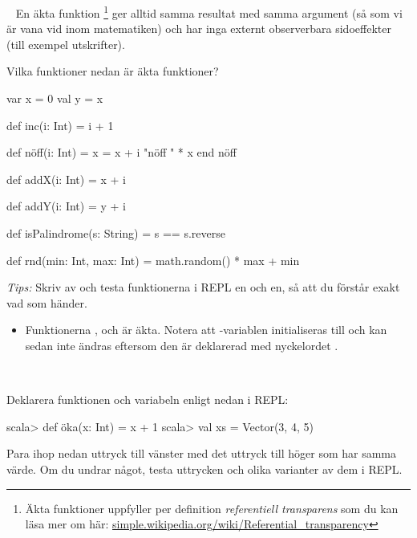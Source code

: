 \QUESTBEGIN

\Task  \what~  En äkta funktion%
\footnote{Äkta funktioner uppfyller per definition  \textit{referentiell transparens}  som du kan läsa mer om här:  \href{https://simple.wikipedia.org/wiki/Referential_transparency}{simple.wikipedia.org/wiki/Referential\_transparency}}
 ger alltid samma resultat med samma argument (så som vi är vana vid inom matematiken) och har inga externt observerbara sidoeffekter (till exempel utskrifter).

Vilka funktioner nedan är äkta funktioner?
\begin{Code}
var x = 0
val y = x

def inc(i: Int) = i + 1

def nöff(i: Int) = 
  x = x + i
  "nöff " * x
end nöff

def addX(i: Int) = x + i

def addY(i: Int) = y + i

def isPalindrome(s: String) = s == s.reverse

def rnd(min: Int, max: Int) = math.random() * max + min
\end{Code}


\noindent\emph{Tips:} Skriv av och testa funktionerna i REPL en och en, så att du förstår exakt vad som händer.

\SOLUTION

\TaskSolved \what

\begin{itemize}
  \item Funktionerna  ,  och  är äkta. Notera att -variablen initialiseras till  och kan sedan inte ändras eftersom den är deklarerad med nyckelordet .
\end{itemize}

\QUESTEND



\QUESTBEGIN

\Task  \what~

\noindent Deklarera funktionen  och variabeln  enligt nedan i REPL:
\begin{REPL}
scala> def öka(x: Int) = x + 1
scala> val xs = Vector(3, 4, 5)
\end{REPL}
\noindent Para ihop nedan uttryck till vänster med det uttryck till höger som har samma värde. Om du undrar något, testa uttrycken och olika varianter av dem i REPL.

